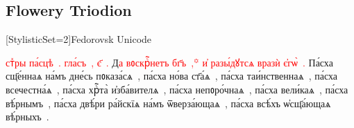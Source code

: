 \subsection{Flowery Triodion}
\newfontfamily{\left}[StylisticSet=2]{Fedorovsk Unicode}

{\Large \left

\textcolor{red}{стⷯры па́сцѣ . гла́съ , є҃ .} Д\textcolor{red}{а вᲂскрⷭ҇нетъ бг҃ъ ,꙳ и҆ разы́дꙋтсѧ вразѝ є҆гѡ̀ .}
Па́сха сщ҃е́ннаѧ на́мъ дне́сь пᲂказа́сѧ , па́сха но́ва ст҃а́ѧ , па́сха таи́нственнаѧ , па́сха всечестна́ѧ , па́сха хрⷭ҇та̀ и҆зба́вителѧ , па́сха непᲂро́чнаѧ , па́сха вели́каѧ , па́сха вѣ́рнымъ , па́сха двѣ́ри ра́йскїѧ на́мъ ѿверза́ющаѧ , па́сха всѣ́хъ ѡ҆сщ҃а́ющаѧ вѣ́рныхъ .
}
